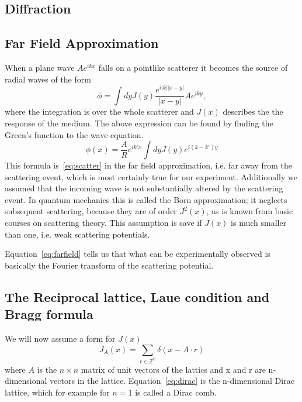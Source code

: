 \documentclass[a4paper,10pt]{scrartcl}
\begin{document}
\subsection{Diffraction}

\subsection{Far Field Approximation}

When a plane wave $Ae^{ikx}$ falls on a pointlike scatterer it becomes the source of radial waves of the form
\begin{equation}
\phi=\int dy J(y)\frac{e^{i|k||x-y|}}{|x-y|} A e^{iky}, \label{eq:scatter}
\end{equation}
where the integration is over the whole scatterer and $J(x)$ describes the the response of the medium. The above expression can be found by finding the Green's function to the wave equation.
\begin{equation}
\phi(x)=\frac{A}{R}e^{ik'x}\int dyJ(y)e^{i(k-k')y}  \label{eq:farfield}
\end{equation}
This formula is~\eqref{eq:scatter} in the far field approximation, i.e. far away from the scattering event, which is most certainly true for our experiment. Additionally we assumed that the incoming wave is not substantially altered by the scattering event. In quantum mechanics this is called the Born approximation; it neglects subsequent scattering, because they are of order $J^{2}(x)$, as is known from basic courses on scattering theory. This assumption is save if $J(x)$ is much smaller than one, i.e. weak scattering potentials.

Equation~\eqref{eq:farfield} tells us that what can be experimentally observed is basically the Fourier transform of the scattering potential. 

\subsection{The Reciprocal lattice, Laue condition and Bragg formula}

We will now assume a form for $J(x)$
\begin{equation}
J_{A}(x)=\sum_{r\in\mathbb{\mathbb{Z^{n}}}}\delta(x-A\cdot r) \label{eq:dirac}
\end{equation} 
where $A$ is the $n \times n$ matrix of unit vectors of the lattics and x and r are n-dimensional vectors in the lattice. Equation~\eqref{eq:dirac} is the n-dimensional Dirac lattice, which for example for $n=1$ is called a Dirac comb. 
\end{document}
